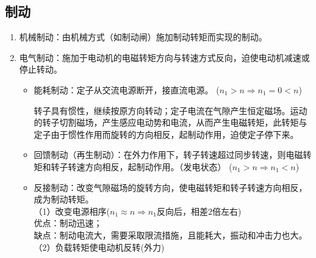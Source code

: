 \documentclass[blue]{elegantnote}
\begin{document}
\begin{enumerate}
		\section{制动}
		\begin{enumerate}
			\item 机械制动：由机械方式（如制动闸）施加制动转矩而实现的制动。
			\item 电气制动：施加于电动机的电磁转矩方向与转速方式反向，迫使电动机减速或停止转动。
			\begin{itemize}
				\item 能耗制动：{\color{blue}定子}从交流电源断开，{\color{blue}接直流电源。}
				($n_1>n\Rightarrow n_1=0<n$)
				\begin{note}
					转子具有惯性，继续按原方向转动；定子电流在气隙产生{\color{blue}恒定磁场}。运动的转子切割磁场，产生感应电动势和电流，从而产生{\color{blue}电磁转矩}，此转矩与定子由于{\color{blue}惯性}作用而旋转的方向相反，起{\color{blue}制动}作用，迫使定子停下来。
				\end{note}
				\item 回馈制动（再生制动）：在{\color{blue}外力}作用下，{\color{blue}转子转速超过同步转速}，则电磁转矩和转子转速方向相反，起制动作用。{\color{blue}（发电状态）}
				($n_1>n\Rightarrow n_1<n$)
				\item 反接制动：{\color{blue}改变气隙磁场的旋转方向}，使电磁转矩和转子转速方向相反，成为制动转矩。
				\\（1）改变电源相序($n_1\approx n\Rightarrow n_1$反向后，相差$2$倍左右)
				\\优点：制动迅速；
				\\缺点：制动电流大，需要采取限流措施，且能耗大，振动和冲击力也大。
				\\（2）负载转矩使电动机反转{\color{blue}(外力)}
			\end{itemize}
		\end{enumerate}
	\end{enumerate}
\end{document}
